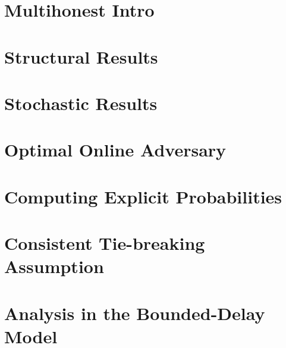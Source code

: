 \chapter{Multihonest Intro}

\chapter{Structural Results}
\chapter{Stochastic Results}
\chapter{Optimal Online Adversary}
\chapter{Computing Explicit Probabilities}
\chapter{Consistent Tie-breaking Assumption}
\chapter{Analysis in the Bounded-Delay Model}
